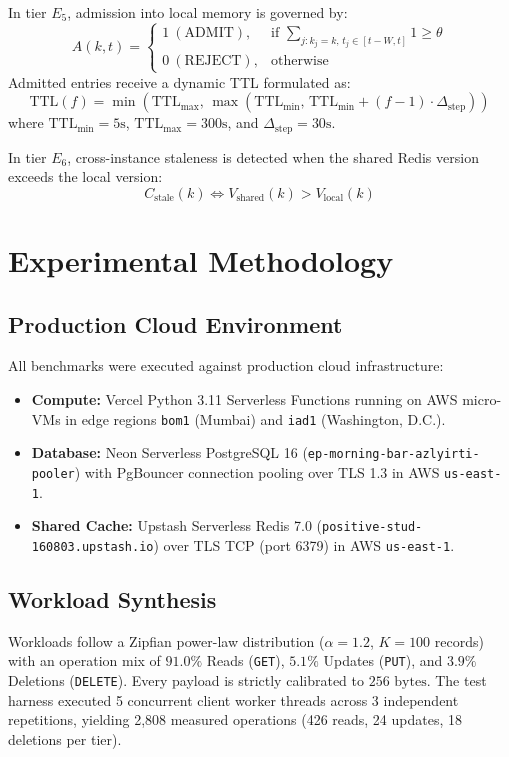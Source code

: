 \documentclass[conference]{IEEEtran}
\begin{document}
In tier $E_5$, admission into local memory is governed by:
\begin{equation}
A(k, t) = \begin{cases} 
1 \ (\text{ADMIT}), & \text{if } \sum_{j: k_j = k,\, t_j \in [t - W, t]} 1 \ge \theta \\ 
0 \ (\text{REJECT}), & \text{otherwise} 
\end{cases}
\end{equation}
Admitted entries receive a dynamic TTL formulated as:
\begin{equation}
\text{TTL}(f) = \min\left(\text{TTL}_{\max},\, \max\left(\text{TTL}_{\min},\, \text{TTL}_{\min} + (f - 1) \cdot \Delta_{\text{step}}\right)\right)
\end{equation}
where $\text{TTL}_{\min} = 5\text{s}$, $\text{TTL}_{\max} = 300\text{s}$, and $\Delta_{\text{step}} = 30\text{s}$.

In tier $E_6$, cross-instance staleness is detected when the shared Redis version exceeds the local version:
\begin{equation}
C_{\text{stale}}(k) \iff V_{\text{shared}}(k) > V_{\text{local}}(k)
\end{equation}

\section{Experimental Methodology}
\subsection{Production Cloud Environment}
All benchmarks were executed against production cloud infrastructure:
\begin{itemize}
    \item \textbf{Compute:} Vercel Python 3.11 Serverless Functions running on AWS micro-VMs in edge regions \texttt{bom1} (Mumbai) and \texttt{iad1} (Washington, D.C.).
    \item \textbf{Database:} Neon Serverless PostgreSQL 16 (\texttt{ep-morning-bar-azlyirti-pooler}) with PgBouncer connection pooling over TLS 1.3 in AWS \texttt{us-east-1}.
    \item \textbf{Shared Cache:} Upstash Serverless Redis 7.0 (\texttt{positive-stud-160803.upstash.io}) over TLS TCP (port 6379) in AWS \texttt{us-east-1}.
\end{itemize}

\subsection{Workload Synthesis}
Workloads follow a Zipfian power-law distribution ($\alpha = 1.2$, $K=100$ records) with an operation mix of $91.0\%$ Reads (\texttt{GET}), $5.1\%$ Updates (\texttt{PUT}), and $3.9\%$ Deletions (\texttt{DELETE}). Every payload is strictly calibrated to $256\text{ bytes}$. The test harness executed 5 concurrent client worker threads across 3 independent repetitions, yielding 2,808 measured operations (426 reads, 24 updates, 18 deletions per tier).
\end{document}
